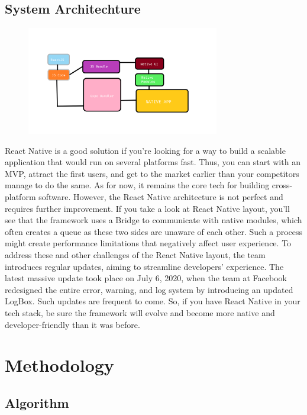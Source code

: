 \documentclass[12pt,a4paper]{report}
\begin{document}
\newpage

\section{System Architechture}
\begin{figure}[h]
    \centering
    \includegraphics[width=0.75\textwidth]{arch}
\end{figure}
 React Native is a good solution if you’re looking for a way to build a scalable application that would run on several platforms fast. Thus, you can start with an MVP, attract the first users, and get to the market earlier than your competitors manage to do the same. As for now, it remains the core tech for building cross-platform software. However, the React Native architecture is not perfect and requires further improvement. If you take a look at React Native layout, you’ll see that the framework uses a Bridge to communicate with native modules, which often creates a queue as these two sides are unaware of each other. Such a process might create performance limitations that negatively affect user experience. To address these and other challenges of the React Native layout, the team introduces regular updates, aiming to streamline developers’ experience. The latest massive update took place on July 6, 2020, when the team at Facebook redesigned the entire error, warning, and log system by introducing an updated LogBox. Such updates are frequent to come. So, if you have React Native in your tech stack, be sure the framework will evolve and become more native and developer-friendly than it was before.

\newpage

\chapter{Methodology}
\section{Algorithm}
\end{document}
